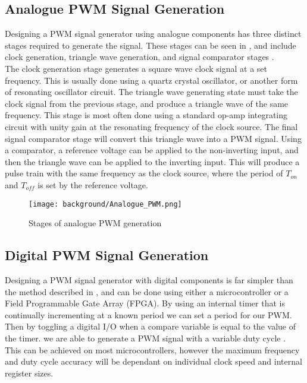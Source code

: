 \subsection{Analogue PWM Signal Generation} \label{S:analogue_PWM_back}

Designing a PWM signal generator using analogue components has three distinct stages required to generate the signal. These stages can be seen in , and include clock generation, triangle wave generation, and signal comparator stages \cite{Caldwell2013}.\\ 

The clock generation stage generates a square wave clock signal at a set frequency. This is usually done using a quartz crystal oscillator, or another form of resonating oscillator circuit. The triangle wave generating state must take the clock signal from the previous stage, and produce a triangle wave of the same frequency. This stage is most often done using a standard op-amp integrating circuit with unity gain at the resonating frequency of the clock source. The final signal comparator stage will convert this triangle wave into a PWM signal. Using a comparator, a reference voltage can be applied to the non-inverting input, and then the triangle wave can be applied to the inverting input. This will produce a pulse train with the same frequency as the clock source, where the period of $T_{on}$ and $T_{off}$ is set by the reference voltage. 

\begin{figure}[H]
	\texttt{[image: background/Analogue\_PWM.png]}
	\caption{Stages of analogue PWM generation}
	\label{F:analogue_PWM}
\end{figure}


\subsection{Digital PWM Signal Generation}\label{S:digital_PWM_back}

Designing a PWM signal generator with digital components is far simpler than the method described in , and can be done using either a microcontroller or a Field Programmable Gate Array (FPGA). By using an internal timer that is continually incrementing at a known period we can set a period for our PWM. Then by toggling a digital I/O when a compare variable is equal to the value of the timer. we are able to generate a PWM signal with a variable duty cycle \cite{Colley2020}. This can be achieved on most microcontrollers, however the maximum frequency and duty cycle accuracy will be dependant on individual clock speed and internal register sizes.

